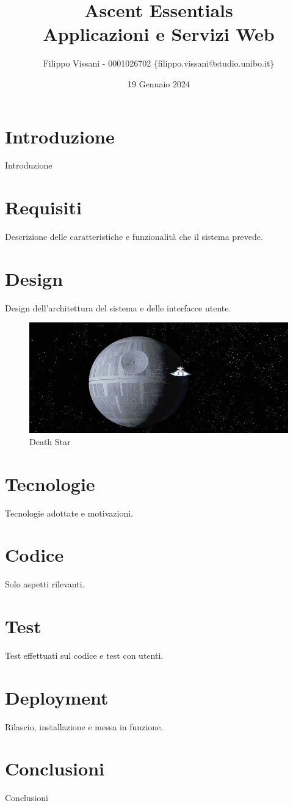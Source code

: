 \documentclass{report}
\title{
    Ascent Essentials \\
    \large Applicazioni e Servizi Web
}
\author{Filippo Vissani - 0001026702 \{filippo.vissani@studio.unibo.it\}}
\date{19 Gennaio 2024}
\begin{document}
\maketitle
\section{Introduzione}
Introduzione \citep{adams1995hitchhiker}

\section{Requisiti}
Descrizione delle caratteristiche e funzionalità che il sistema prevede. 

\section{Design}
Design dell'architettura del sistema e delle interfacce utente.

\begin{figure}[h!]
\centering
\includegraphics[scale=0.44]{deathStar2.jpg}
\caption{Death Star}
\label{fig:deathstar}
\end{figure}

\section{Tecnologie}
Tecnologie adottate e motivazioni.

\section{Codice}
Solo aspetti rilevanti.

\section{Test}
Test effettuati sul codice e test con utenti.

\section{Deployment}
Rilascio, installazione e messa in funzione.


\section{Conclusioni}
Conclusioni



\end{document}
